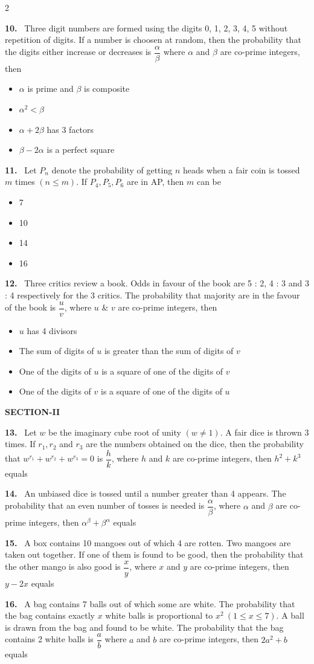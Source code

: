 \documentclass[10pt]{extarticle}
\newcommand{\sect}[1]{\par\smallskip\noindent\textbf{#1}\par}
\newcommand{\qn}[1]{\par\smallskip\noindent\textbf{#1.}~}
\newenvironment{qoptions}{\begin{itemize}[leftmargin=1.8em,itemsep=1pt,topsep=2pt,label={}]}{\end{itemize}}
\newcommand{\opt}[2]{\item[(#1)] #2}
\begin{document}
\begin{multicols}{2}
\begin{qoptions}
\end{qoptions}
\qn{10} Three digit numbers are formed using the digits 0, 1, 2, 3, 4, 5 without repetition of digits. If a number is choosen at random, then the probability that the digits either increase or decreases is $\dfrac\alpha\beta$ where $\alpha$ and $\beta$ are co-prime integers, then
\begin{qoptions}
\opt{A}{$\alpha$ is prime and $\beta$ is composite}
\opt{B}{$\alpha^2<\beta$}
\opt{C}{$\alpha+2\beta$ has 3 factors}
\opt{D}{$\beta-2\alpha$ is a perfect square}
\end{qoptions}
\qn{11} Let $P_n$ denote the probability of getting $n$ heads when a fair coin is tossed $m$ times $(n\le m)$. If $P_4,P_5,P_6$ are in AP, then $m$ can be
\begin{qoptions}
\opt{A}{7}
\opt{B}{10}
\opt{C}{14}
\opt{D}{16}
\end{qoptions}
\qn{12} Three critics review a book. Odds in favour of the book are 5 : 2, 4 : 3 and 3 : 4 respectively for the 3 critics. The probability that majority are in the favour of the book is $\dfrac uv$, where $u$ \& $v$ are co-prime integers, then
\begin{qoptions}
\opt{A}{$u$ has 4 divisors}
\opt{B}{The sum of digits of $u$ is greater than the sum of digits of $v$}
\opt{C}{One of the digits of $u$ is a square of one of the digits of $v$}
\opt{D}{One of the digits of $v$ is a square of one of the digits of $u$}
\end{qoptions}
\sect{SECTION-II}
\qn{13} Let $w$ be the imaginary cube root of unity $(w\ne1)$. A fair dice is thrown 3 times. If $r_1,r_2$ and $r_3$ are the numbers obtained on the dice, then the probability that $w^{r_1}+w^{r_2}+w^{r_3}=0$ is $\dfrac hk$, where $h$ and $k$ are co-prime integers, then $h^2+k^3$ equals \underline{\hspace{1.5cm}}
\qn{14} An unbiased dice is tossed until a number greater than 4 appears. The probability that an even number of tosses is needed is $\dfrac\alpha\beta$, where $\alpha$ and $\beta$ are co-prime integers, then $\alpha^\beta+\beta^\alpha$ equals \underline{\hspace{1.5cm}}
\qn{15} A box contains 10 mangoes out of which 4 are rotten. Two mangoes are taken out together. If one of them is found to be good, then the probability that the other mango is also good is $\dfrac xy$, where $x$ and $y$ are co-prime integers, then $y-2x$ equals \underline{\hspace{1.5cm}}
\qn{16} A bag contains 7 balls out of which some are white. The probability that the bag contains exactly $x$ white balls is proportional to $x^2\ (1\le x\le7)$. A ball is drawn from the bag and found to be white. The probability that the bag contains 2 white balls is $\dfrac ab$ where $a$ and $b$ are co-prime integers, then $2a^2+b$ equals \underline{\hspace{1.5cm}}

\end{multicols}
\end{document}
